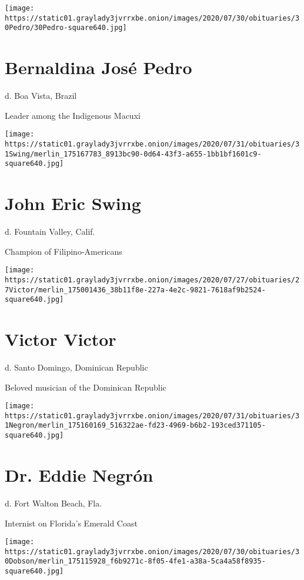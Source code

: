 \texttt{[image: https://static01.graylady3jvrrxbe.onion/images/2020/07/30/obituaries/30Pedro/30Pedro-square640.jpg]}

\hypertarget{bernaldina-josuxe9-pedro}{%
\section{Bernaldina José Pedro}\label{bernaldina-josuxe9-pedro}}

d. Boa Vista, Brazil

Leader among the Indigenous Macuxi

\texttt{[image: https://static01.graylady3jvrrxbe.onion/images/2020/07/31/obituaries/31Swing/merlin\_175167783\_8913bc90-0d64-43f3-a655-1bb1bf1601c9-square640.jpg]}

\hypertarget{john-eric-swing}{%
\section{John Eric Swing}\label{john-eric-swing}}

d. Fountain Valley, Calif.

Champion of Filipino-Americans

\texttt{[image: https://static01.graylady3jvrrxbe.onion/images/2020/07/27/obituaries/27Victor/merlin\_175001436\_38b11f8e-227a-4e2c-9821-7618af9b2524-square640.jpg]}

\hypertarget{victor-victor}{%
\section{Victor Victor}\label{victor-victor}}

d. Santo Domingo, Dominican Republic

Beloved musician of the Dominican Republic

\texttt{[image: https://static01.graylady3jvrrxbe.onion/images/2020/07/31/obituaries/31Negron/merlin\_175160169\_516322ae-fd23-4969-b6b2-193ced371105-square640.jpg]}

\hypertarget{dr-eddie-negruxf3n}{%
\section{Dr. Eddie Negrón}\label{dr-eddie-negruxf3n}}

d. Fort Walton Beach, Fla.

Internist on Florida's Emerald Coast

\texttt{[image: https://static01.graylady3jvrrxbe.onion/images/2020/07/30/obituaries/30Dobson/merlin\_175115928\_f6b9271c-8f05-4fe1-a38a-5ca4a58f8935-square640.jpg]}

